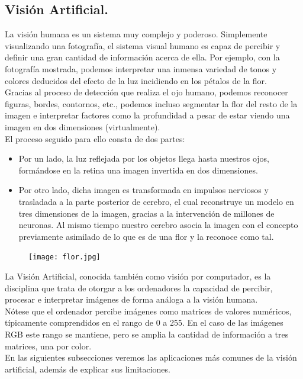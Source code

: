 \documentclass[a4paper,10pt]{article}
\begin{document}
\subsection{Visión Artificial.}
La visión humana es un sistema muy complejo y poderoso. Simplemente
visualizando una fotografía, el sistema visual humano es capaz
de percibir y definir una gran cantidad de información acerca de ella. Por ejemplo, con la fotografía mostrada, podemos interpretar una inmensa variedad de tonos y colores deducidos del efecto de la luz incidiendo en los pétalos de la flor.
\\Gracias al proceso de detección que realiza el ojo humano, podemos reconocer figuras, bordes, contornos, etc., podemos incluso segmentar la flor del resto de la imagen e interpretar factores como la profundidad a pesar de estar viendo una imagen en dos dimensiones (virtualmente).\\
El proceso seguido para ello consta de dos partes:
\begin{itemize}
\item Por un lado, la luz reflejada por los objetos llega hasta nuestros ojos, formándose en la retina una imagen invertida en dos
dimensiones. 
\item Por otro lado, dicha imagen es transformada en impulsos nerviosos y trasladada a la parte posterior de cerebro, 
el cual reconstruye un modelo en tres dimensiones de la imagen, gracias a la intervención de millones de neuronas. Al mismo tiempo nuestro cerebro asocia la imagen con el concepto previamente asimilado de lo que es de una flor y la reconoce como tal.
\end{itemize}

\begin{figure}[H]
\centering
\texttt{[image: flor.jpg]}
\end{figure}
\noindent
La Visión Artificial, conocida también como visión por computador, es la disciplina que trata de otorgar a los ordenadores la capacidad de percibir, procesar  e interpretar imágenes de forma análoga a la visión humana. \\Nótese que el ordenador percibe imágenes como matrices de valores numéricos, típicamente comprendidos en el rango de 0 a 255. En el caso de las imágenes RGB este rango se mantiene, pero se amplia la cantidad de información a tres matrices, una por color.\\
En las siguientes subsecciones veremos las aplicaciones más comunes de la visión artificial, además de explicar sus limitaciones.
\end{document}
